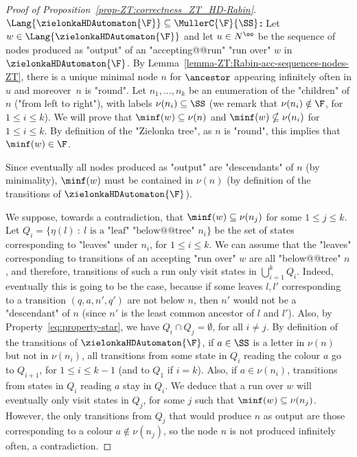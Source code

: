\documentclass{theoretics}
\begin{document}
\begin{proof}[Proof of Proposition~\ref{prop-ZT:correctness_ZT_HD-Rabin}]
	\textbf{$\Lang{\zielonkaHDAutomaton{\F}} \subseteq \MullerC{\F}{\SS}$:} Let $w\in \Lang{\zielonkaHDAutomaton{\F}}$ and let $u\in N^\oo$ be the sequence of nodes produced as "output" of an "accepting@@run" "run over" $w$ in $\zielonkaHDAutomaton{\F}$. By Lemma~\ref{lemma-ZT:Rabin-acc-sequences-nodes-ZT}, there is a unique  minimal node $n$ for $\ancestor$ appearing infinitely often in $u$ and moreover~$n$ is "round".
	Let $n_1, \dots, n_k$ be an enumeration of the "children" of $n$ ("from left to right"), with labels $\nu(n_i)\subseteq \SS$ (we remark that $\nu(n_i)\notin \F$, for $1\leq i \leq k$). We will prove that $\minf(w)\subseteq \nu(n)$ and $\minf(w)\nsubseteq \nu(n_i)$ for $1\leq i \leq k$. By definition of the "Zielonka tree", as $n$ is "round", this implies that $\minf(w)\in \F$.
	
	
	Since eventually all nodes produced as "output" are "descendants" of $n$ (by minimality), $\minf(w)$ must be contained in $\nu(n)$ (by definition of the transitions of $\zielonkaHDAutomaton{\F}$).
	
	We suppose, towards a contradiction, that $\minf(w)\subseteq \nu(n_j)$ for some $1\leq j \leq k$.  
	Let $Q_i=\{\eta(l)\: : \: l \text{ is a "leaf" "below@@tree" } n_i\}$ be the set of states corresponding to "leaves" under $n_i$, for $1\leq i \leq k$. We can assume that the "leaves" corresponding to transitions of an accepting "run over" $w$ are all "below@@tree" $n$, and therefore, transitions of such a run only visit states in $\bigcup_{i=1}^kQ_i$. Indeed, eventually this is going to be the case, because if some leaves $l, l'$ corresponding to a transition $(q,a,n',q')$ are not below $n$, then $n'$ would not be a "descendant" of $n$ (since $n'$ is the least common ancestor of $l$ and $l'$).
	Also, by Property~\eqref{eq:property-star}, we have $Q_i\cap Q_j = \emptyset$, for all $i\neq j$.
	By definition of the transitions of $\zielonkaHDAutomaton{\F}$, if $a\in \SS$ is a letter in $\nu(n)$ but not in $\nu(n_i)$, all transitions from some state in $Q_i$ reading the colour $a$ go to $Q_{i+1}$, for $1\leq i \leq k-1$ (and to $Q_1$ if $i=k$).
	Also, if $a\in \nu(n_i)$, transitions from states in $Q_i$ reading $a$ stay in $Q_i$.	
	We deduce that a run over $w$ will eventually only visit states in $Q_j$, for some $j$ such that $\minf(w)\subseteq \nu(n_j)$. However, the only transitions
	from $Q_j$ that would produce $n$ as output are those corresponding to a colour $a\notin \nu(n_j)$, so the node $n$ is not produced infinitely often, a contradiction.	


\end{proof}
\end{document}
